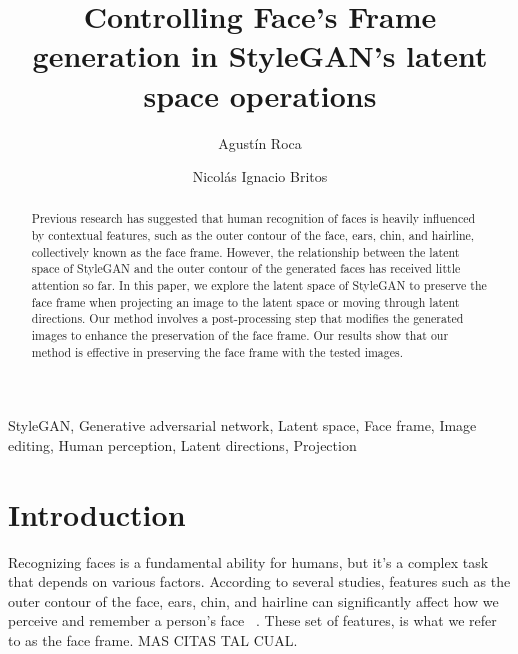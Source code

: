 \documentclass[review]{elsarticle}
\begin{document}
\begin{frontmatter}

\title{Controlling Face's Frame generation in StyleGAN's latent space operations}

\author[1]{Agustín Roca}

\author[1]{Nicolás Ignacio Britos}



\begin{abstract}

Previous research has suggested that human recognition of faces is heavily influenced by contextual features, such as the outer contour of the face, ears, chin, and hairline, collectively known as the face frame. However, the relationship between the latent space of StyleGAN and the outer contour of the generated faces has received little attention so far. In this paper, we explore the latent space of StyleGAN to preserve the face frame when projecting an image to the latent space or moving through latent directions. Our method involves a post-processing step that modifies the generated images to enhance the preservation of the face frame. Our results show that our method is effective in preserving the face frame with the tested images.

\end{abstract}

\begin{keyword}
StyleGAN, Generative adversarial network, Latent space, Face frame, Image editing, Human perception, Latent directions, Projection
\end{keyword}

\end{frontmatter}

\linenumbers 

\section{Introduction}

Recognizing faces is a fundamental ability for humans, but it's a complex task that depends on various factors. According to several studies, features such as the outer contour of the face, ears, chin, and hairline can significantly affect how we perceive and remember a person's face~\cite{want2003} %
. These set of features, is what we refer to as the face frame. MAS CITAS TAL CUAL.
\end{document}
